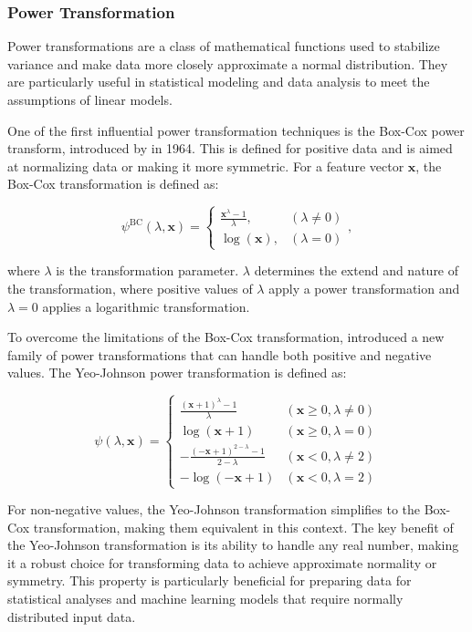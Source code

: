 \subsubsection{Power Transformation}
Power transformations are a class of mathematical functions used to stabilize variance and make data more closely approximate a normal distribution.
They are particularly useful in statistical modeling and data analysis to meet the assumptions of linear models.

One of the first influential power transformation techniques is the Box-Cox power transform, introduced by \citet{BoxAndCox} in 1964.
This is defined for positive data and is aimed at normalizing data or making it more symmetric.
For a feature vector $\mathbf{x}$, the Box-Cox transformation is defined as:

$$
\psi^{\text{BC}}(\lambda, \mathbf{x}) =
\begin{cases}
\frac{\mathbf{x}^\lambda - 1}{\lambda}, & (\lambda \neq 0) \\
\log(\mathbf{x}), & (\lambda = 0)
\end{cases},
$$

where $\lambda$ is the transformation parameter.
$\lambda$ determines the extend and nature of the transformation, where positive values of $\lambda$ apply a power transformation and $\lambda = 0$ applies a logarithmic transformation.

To overcome the limitations of the Box-Cox transformation, \citet{YeoJohnson} introduced a new family of power transformations that can handle both positive and negative values.
The Yeo-Johnson power transformation is defined as:

$$
\psi(\lambda, \mathbf{x}) =
\begin{cases}
\frac{(\mathbf{x} + 1)^\lambda - 1}{\lambda} & (\mathbf{x} \geq 0, \lambda \neq 0) \\
\log(\mathbf{x} + 1) & (\mathbf{x} \geq 0, \lambda = 0) \\
- \frac{(-\mathbf{x} + 1)^{2 - \lambda} - 1}{2 - \lambda} & (\mathbf{x} < 0, \lambda \neq 2) \\
-\log(-\mathbf{x} + 1) & (\mathbf{x} < 0, \lambda = 2)
\end{cases}
$$

For non-negative values, the Yeo-Johnson transformation simplifies to the Box-Cox transformation, making them equivalent in this context.
The key benefit of the Yeo-Johnson transformation is its ability to handle any real number, making it a robust choice for transforming data to achieve approximate normality or symmetry.
This property is particularly beneficial for preparing data for statistical analyses and machine learning models that require normally distributed input data.